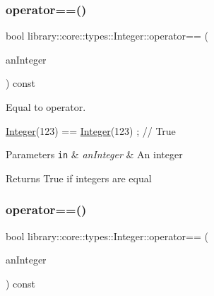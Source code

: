 \subsubsection{\texorpdfstring{operator==()}{operator==()}\hspace{0.1cm}{\footnotesize\ttfamily [1/2]}}
{\footnotesize\ttfamily bool library\+::core\+::types\+::\+Integer\+::operator== (\begin{DoxyParamCaption}\item[{const \hyperlink{classlibrary_1_1core_1_1types_1_1_integer}{Integer} \&}]{an\+Integer }\end{DoxyParamCaption}) const}



Equal to operator. 


\begin{DoxyCode}
\hyperlink{classlibrary_1_1core_1_1types_1_1_integer_a6483b1c4e13e5ed6af5e7a58347efead}{Integer}(123) == \hyperlink{classlibrary_1_1core_1_1types_1_1_integer_a6483b1c4e13e5ed6af5e7a58347efead}{Integer}(123) ; \textcolor{comment}{// True}
\end{DoxyCode}



\begin{DoxyParams}[1]{Parameters}
\mbox{\tt in}  & {\em an\+Integer} & An integer \\
\hline
\end{DoxyParams}
\begin{DoxyReturn}{Returns}
True if integers are equal 
\end{DoxyReturn}
\mbox{\label{classlibrary_1_1core_1_1types_1_1_integer_a02858e726140a9e84281699a41675081}} 
\subsubsection{\texorpdfstring{operator==()}{operator==()}\hspace{0.1cm}{\footnotesize\ttfamily [2/2]}}
{\footnotesize\ttfamily bool library\+::core\+::types\+::\+Integer\+::operator== (\begin{DoxyParamCaption}\item[{const \hyperlink{classlibrary_1_1core_1_1types_1_1_integer_a623afb1580f870fd8a1997b1c12c917d}{Integer\+::\+Value\+Type} \&}]{an\+Integer }\end{DoxyParamCaption}) const}



